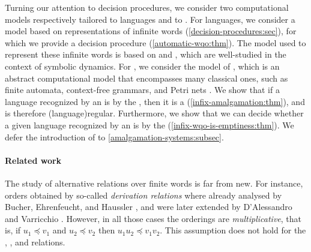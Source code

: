 Turning our attention to decision procedures, we consider two computational
models respectively tailored to  languages and to
. For  languages, we consider a
model based on representations of infinite words
(\cref{decision-procedures:sec}), for which we provide a decision procedure
(\cref{automatic-wqo:thm}). The model used to represent these infinite words is
based on  and  \cite{CAKA97},
which are well-studied in the context of symbolic dynamics. For , we consider the model of  \cite{ASZZ24},
which is an abstract computational model that encompasses many classical ones,
such as finite automata, context-free grammars, and Petri nets \cite{ASZZ24}.
We show that if a language recognized by an  is
 by the , then it is a  (\cref{infix-amalgamation:thm}), and is therefore
\kl(language){regular}. Furthermore, we show that we can decide whether a given
language recognized by an  is 
by the  (\cref{infix-wqo-is-emptiness:thm}). We defer the
introduction of  to
\cref{amalgamation-systems:subsec}.

\paragraph*{Related work} The study of alternative 
relations over finite words is far from new. For instance, orders obtained by
so-called \emph{derivation relations} where already analysed by Bucher,
Ehrenfeucht, and Haussler \cite{BUEUD85}, and were later extended by
D'Alessandro and Varricchio \cite{ALVA03,ALVA06}. However, in all those cases
the orderings are \emph{multiplicative}, that is, if $u_1 \preceq v_1$ and $u_2
\preceq v_2$ then $u_1u_2 \preceq v_1v_2$. This assumption does not hold for
the , , and  relations.

